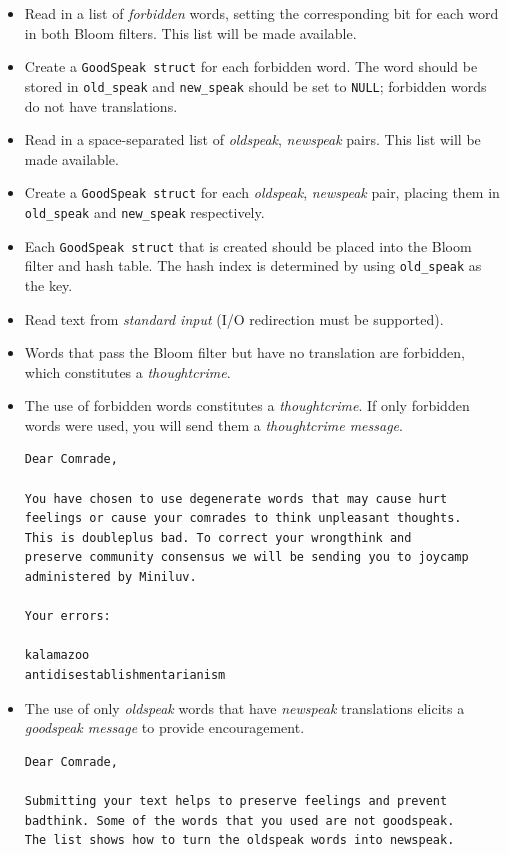 \documentclass{article}
\begin{document}
\begin{itemize}
\item Read in a list of \emph{forbidden} words, setting the corresponding bit
    for each word in both Bloom filters. This list will be made available.
\item Create a \texttt{GoodSpeak struct} for each forbidden word. The word
    should be stored in \texttt{old\_speak} and \texttt{new\_speak} should be
    set to \texttt{NULL}; forbidden words do not have translations.
\item Read in a space-separated list of \emph{oldspeak}, \emph{newspeak} pairs.
    This list will be made available.
\item Create a \texttt{GoodSpeak struct} for each \emph{oldspeak},
    \emph{newspeak} pair, placing them in \texttt{old\_speak} and
    \texttt{new\_speak} respectively.
\item Each \texttt{GoodSpeak struct} that is created should be placed into the
    Bloom filter and hash table. The hash index is determined by using
    \texttt{old\_speak} as the key.
\item Read text from \emph{standard input} (I/O redirection must be supported).
\item Words that pass the Bloom filter but have no translation are forbidden,
    which constitutes a \emph{thoughtcrime}.
\item The use of forbidden words constitutes a \emph{thoughtcrime}. If only
    forbidden words were used, you will send them a \emph{thoughtcrime message}.
\begin{lstlisting}[title=Example thoughtcrime message.]
Dear Comrade,

You have chosen to use degenerate words that may cause hurt
feelings or cause your comrades to think unpleasant thoughts.
This is doubleplus bad. To correct your wrongthink and
preserve community consensus we will be sending you to joycamp
administered by Miniluv.

Your errors:

kalamazoo
antidisestablishmentarianism
\end{lstlisting}
\item The use of only \emph{oldspeak} words that have \emph{newspeak}
    translations elicits a \emph{goodspeak message} to provide encouragement.
\begin{lstlisting}[title=Example goodspeak message.]
Dear Comrade,

Submitting your text helps to preserve feelings and prevent
badthink. Some of the words that you used are not goodspeak.
The list shows how to turn the oldspeak words into newspeak.


\end{lstlisting}
\end{itemize}
\end{document}
